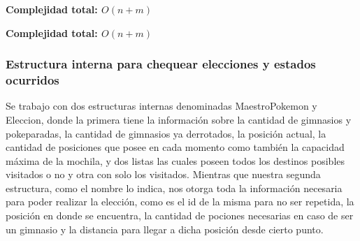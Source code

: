 \begin{algorithm}[H]
\textbf{\hfill Complejidad total: $O(n+m)$}\\ 
\end{algorithm}



\begin{algorithm}[H]
\textbf{\hfill Complejidad total: $O(n+m)$}\\ 
\end{algorithm}



\subsubsection{Estructura interna para chequear elecciones y estados ocurridos}

Se trabajo con dos estructuras internas denominadas MaestroPokemon y Eleccion, donde la primera tiene la informaci\'on sobre la cantidad de gimnasios y pokeparadas, la cantidad de gimnasios ya derrotados, la posici\'on actual, la cantidad de posiciones que posee en cada momento como tambi\'en la capacidad m\'axima de la mochila, y dos listas las cuales poseen todos los destinos posibles visitados o no y otra con solo los visitados.
Mientras que nuestra segunda estructura, como el nombre lo indica, nos otorga toda la informaci\'on necesaria para poder realizar la elecci\'on, como es el id de la misma para no ser repetida, la posici\'on en donde se encuentra, la cantidad de pociones necesarias en caso de ser un gimnasio y la distancia para llegar a dicha posici\'on desde cierto punto.

